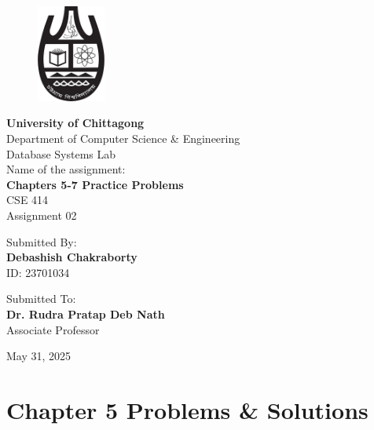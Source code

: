 \documentclass[12pt,a4paper]{article}
\begin{document}
\begin{titlepage}
    \begin{figure}[htbp]
    \centering
    \includegraphics[width=0.2\textwidth]{cu.png}
    \end{figure}
    \centering
    \vspace*{0.5cm}
    {\Huge\bfseries University of Chittagong}\\[0.5cm]
    {\Large Department of Computer Science \& Engineering}\\[0.5cm]
    {\large Database Systems Lab}\\[2cm]
    
    {\large Name of the assignment:}\\[0.3cm]
    {\LARGE\bfseries Chapters 5-7 Practice Problems}\\[0.5cm]
    {\large CSE 414}\\[0.5cm]
    {\large Assignment 02}\\[3cm]
    
    \begin{minipage}[t]{0.4\textwidth}
    \raggedleft
    Submitted By:\\
    \large \textbf{Debashish Chakraborty}\\
    \large ID: 23701034
    \end{minipage}
    \hspace{0.05\textwidth}
    \vrule width 1pt
    \hspace{0.05\textwidth}
    \begin{minipage}[t]{0.4\textwidth}
    Submitted To:\\
    \large \textbf{Dr. Rudra Pratap Deb Nath}\\
    \large Associate Professor
    \end{minipage}
    
    \vfill
    {\large May 31, 2025}
\end{titlepage}

\newpage
\tableofcontents
\newpage

\section{Chapter 5 Problems \& Solutions}
\end{document}
